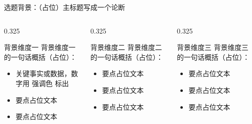 \documentclass[aspectratio=169,11pt]{beamer}
\begin{document}
\begin{frame}{选题背景：（占位）主标题写成一个论断}
  \small
  \begin{columns}[T]
    \begin{column}{0.325\textwidth}
      \begin{dmucard}{背景维度一}
        \footnotesize
        背景维度一的一句话概括（占位）：
        \begin{itemize}
          \item 关键事实或数据，数字用 \textcolor{dmuaccent}{强调色} 标出
          \item 要点占位文本
          \item 要点占位文本
        \end{itemize}
      \end{dmucard}
    \end{column}
    \begin{column}{0.325\textwidth}
      \begin{dmucard}{背景维度二}
        \footnotesize
        背景维度二的一句话概括（占位）：
        \begin{itemize}
          \item 要点占位文本
          \item 要点占位文本
          \item 要点占位文本
        \end{itemize}
      \end{dmucard}
    \end{column}
    \begin{column}{0.325\textwidth}
      \begin{dmucard}{背景维度三}
        \footnotesize
        背景维度三的一句话概括（占位）：
        \begin{itemize}
          \item 要点占位文本
          \item 要点占位文本
          \item 要点占位文本
        \end{itemize}
      \end{dmucard}
    \end{column}
  \end{columns}
\end{frame}
\end{document}
